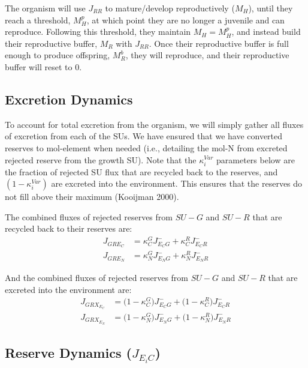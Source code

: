 \documentclass[
]{article}
\begin{document}
The organism will use \(J_{RR}\) to mature/develop reproductively
(\(M_H\)), until they reach a threshold, \(M_{H}^{p}\), at which point
they are no longer a juvenile and can reproduce. Following this
threshold, they maintain \(M_H = M_{H}^{p}\), and instead build their
reproductive buffer, \(M_R\) with \(J_{RR}\). Once their reproductive
buffer is full enough to produce offspring, \(M_{R}^{b}\), they will
reproduce, and their reproductive buffer will reset to 0.

\newpage

\subsection{Excretion Dynamics}\label{excretion-dynamics}

To account for total excretion from the organism, we will simply gather
all fluxes of excretion from each of the SUs. We have ensured that we
have converted reserves to mol-element when needed (i.e., detailing the
mol-N from excreted rejected reserve from the growth SU). Note that the
\(\kappa_{i}^{Var}\) parameters below are the fraction of rejected SU
flux that are recycled back to the reserves, and
\((1- \kappa_{i}^{Var})\) are excreted into the environment. This
ensures that the reserves do not fill above their maximum (Kooijman
2000).

The combined fluxes of rejected reserves from \(SU-G\) and \(SU-R\) that
are recycled back to their reserves are: \begin{align}
J_{GR{E_C}} &= \kappa_{C}^{G}J_{E_{C}G}^{-} + \kappa_{C}^{R}J_{E_{C}R}^{-}
\\
J_{GR{E_N}} &= \kappa_{N}^{G}J_{E_{N}G}^{-} + {\kappa_{N}^{R}}J_{E_{N}R}^{-} 
\end{align}

And the combined fluxes of rejected reserves from \(SU-G\) and \(SU-R\)
that are excreted into the environment are: \begin{align}
J_{GR{X_{E_C}}} &= \biggl(1-\kappa_{C}^{G}\biggr)J_{E_{C}G}^{-} + \biggl(1-\kappa_{C}^{R}\biggr)J_{E_{C}R}^{-}
\\
J_{GR{X_{E_N}}} &= \biggl(1-\kappa_{N}^{G}\biggr)J_{E_{N}G}^{-} + \biggl(1-\kappa_{N}^{R}\biggr)J_{E_{N}R}^{-}
\end{align}

\newpage

\subsection{\texorpdfstring{Reserve Dynamics
(\(J_{E_{i}C}\))}{Reserve Dynamics (J\_\{E\_\{i\}C\})}}\label{reserve-dynamics-j_e_ic}
\end{document}
